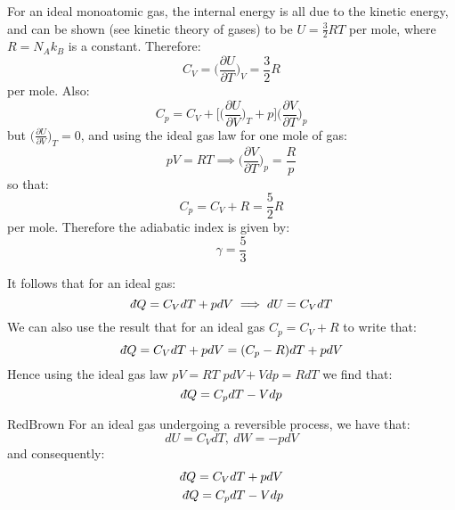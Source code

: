 \documentclass[a4paper,11pt,oneside]{book}
\newcommand{\dbar}{d\hspace*{-0.08em}\bar{}\hspace*{0.1em}}
\begin{document}
\begin{mdframed}


For an ideal monoatomic gas, the internal energy is all due to the kinetic energy, and can be shown (see kinetic theory of gases) to be $U=\frac{3}{2}RT$ per mole, where $R = N_A k_B$ is a constant. Therefore:
\begin{equation}
    C_V = \bigg(\frac{\partial U}{\partial T}\bigg)_V = \frac{3}{2}R
\end{equation}
per mole. Also:
\begin{equation}
    C_p = C_V + \Bigg[\bigg(\frac{\partial U}{\partial V}\bigg)_T+p\Bigg] \bigg(\frac{\partial V}{\partial T}\bigg)_p
\end{equation}
but $\bigg(\frac{\partial U}{\partial V}\bigg)_T=0$, and using the ideal gas law for one mole of gas:
\begin{equation}
    pV = RT \implies \bigg(\frac{\partial V}{\partial T}\bigg)_p=\frac{R}{p}
\end{equation}
so that:
\begin{equation}
    C_p = C_V + R = \frac{5}{2}R
\end{equation}
per mole. Therefore the adiabatic index is given by:
\begin{equation}
    \gamma = \frac{5}{3}
\end{equation}
\end{mdframed}
It follows that for an ideal gas:
\begin{equation}
    \dbar Q = C_V dT + p dV \implies dU = C_V dT
\end{equation}
We can also use the result that for an ideal gas $C_p=C_V+R$ to write that:
\begin{equation}
    \dbar Q = C_V dT + p dV=(C_p-R) dT + pdV
\end{equation}
Hence using the ideal gas law $pV = RT$ $pdV + Vdp = RdT$ we find that:
\begin{equation}
    \dbar Q = C_p dT - V dp
\end{equation}

\begin{mybox}{RedBrown}{\textbf{}}
For an ideal gas undergoing a reversible process, we have that:
\begin{equation}
    dU = C_V dT, \ dW = -pdV
\end{equation}
and consequently:
\begin{align}
         \dbar Q = C_V dT + p dV \\
             \dbar Q = C_p dT - V dp
\end{align}
\end{mybox}
\end{document}
